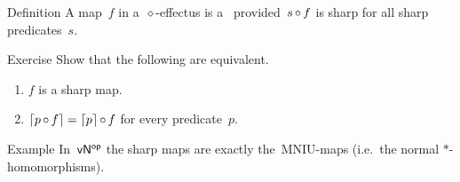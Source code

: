 \documentclass[b]{subfiles}
\begin{document}
\begin{parsec}%
\begin{point}{Definition}%
A map~$f$ in a~$\diamond$-effectus is a~
    provided~$s \mathop{\circ} f$ is sharp for all sharp predicates~$s$.
\end{point}
\begin{point}{Exercise}%
Show that the following are equivalent.
\begin{enumerate}
    \item $f$ is a sharp map.
    \item $\left\lceil p \mathop{\circ} f\right\rceil = \left\lceil p\right\rceil\mathop{\circ} f$
            for every predicate~$p$.
\end{enumerate}
\end{point}

\begin{point}{Example}%
In~${\mathsf{vN}}{^{\mathsf{op}}}$ the sharp maps are exactly the~MNIU-maps
(i.e.~the normal $*$-homomorphisms). 
\end{point}
    
\end{parsec}
\end{document}

